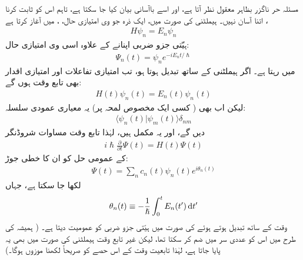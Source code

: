  
مسئلہ حر ناگزر بظاہر معقول نظر آتا ہے،  اور اسے باآسانی بیان کیا جا سکتا ہے،  تاہم اس کو ثابت کرنا اتنا آسان نہیں۔   ہیملٹنی کی صورت میں،  ایک ذرہ جو  وی امتیازی حال، ،   میں آغاز کرتا ہے ،
\begin{align}
H \psi_n = E_n \psi_n
\end{align}
 ہیّتی  جزو ضربی اپنانے کے علاوہ اسی  وی امتیازی حال:
\begin{align}
\Psi_n (t) = \psi_n e^{-i E_n t/ \hslash}
\end{align}
میں رہتا ہے۔  اگر ہیملٹنی   کے ساتھ تبدیل ہوتا ہو،  تب امتیازی تفاعلات اور امتیازی اقدار بھی تابع وقت ہوں گے:
\begin{align}\label{مساوات_حر_تابع_وقت_ہیملٹنی_توانائی}
H(t) \psi_n (t) = E_n (t) \psi_n (t)
\end{align}
لیکن اب بھی ( کسی ایک مخصوص لمحہ پر)  یہ معیاری  عمودی سلسلہ: 
\begin{align}\label{مساوات_حر_لمحاتی_معیاری_عمودی}
\langle \psi_n (t) | \psi_m (t) \rangle \delta_{nm} 
\end{align}
دیں گے، اور یہ     مکمل ہیں،  لہٰذا تابع وقت مساوات شروڈنگر 
\begin{align}\label{مساوات_حر_مساوات_شروڈنگر_الف}
i \hslash \frac{\partial}{\partial t} \Psi (t) = H (t) \Psi (t)
\end{align}
کے عمومی حل کو ان کا خطی جوڑ:
\begin{align}\label{مساوات_حر_مساوات_شروڈنگر_ب}
\Psi (t) = \sum_n c_n (t) \psi_n (t) e^{i \theta_n (t)}
\end{align}
لکھا جا سکتا ہے، جہاں 
\begin{align}\label{مساوات_حر_مساوات_شروڈنگر_پ}
\theta_n (t) \equiv  - \frac{1}{\hslash} \int_0^t E_n (t') \dif t'
\end{align}
وقت کے ساتھ تبدیل ہوتے ہوئے  کی صورت میں    ہیّتی جزو ضربی کو عمومیت دیتا ہے۔ (  ہمیشہ کی طرح میں اس کو  عددی سر  میں ضم  کر سکتا تھا،  لیکن غیر تابع وقت ہیملٹنی کی صورت میں بھی یہ پایا جاتا ہے،  لہٰذا  تابعیت  وقت کے اس حصے  کو صریحاً  لکھنا موزوں ہوگا۔) 

